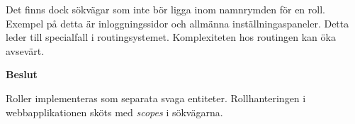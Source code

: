 Det finns dock sökvägar som inte bör ligga inom namnrymden för en roll. Exempel på detta är inloggningssidor och allmänna inställningaspaneler. Detta leder till specialfall i routingsystemet. Komplexiteten hos routingen kan öka avsevärt.

\begin{flushright}
  
  \textbf{Beslut}
  
  Roller implementeras som separata svaga entiteter. Rollhanteringen i webbapplikationen sköts med \emph{scopes} i sökvägarna.
  
\end{flushright}
